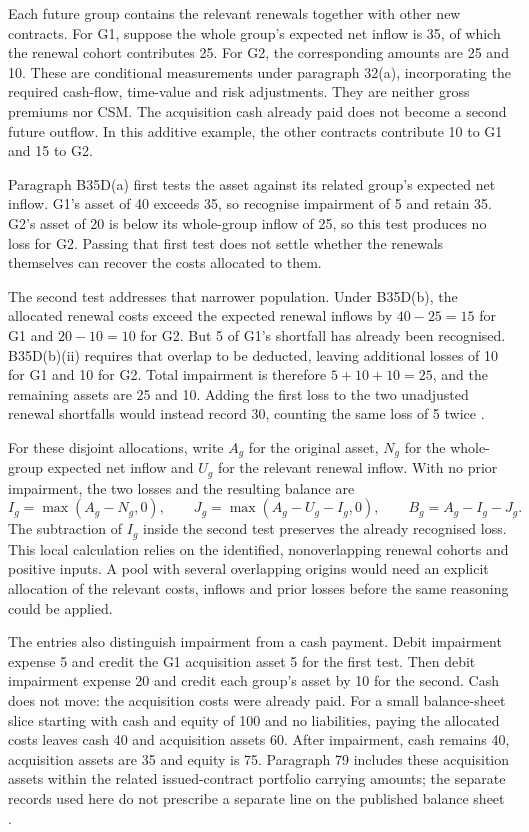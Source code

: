 Each future group contains the relevant renewals together with other new
contracts. For G1, suppose the whole group's expected net inflow is 35,
of which the renewal cohort contributes 25. For G2, the corresponding
amounts are 25 and 10. These are conditional measurements under paragraph
32(a), incorporating the required cash-flow, time-value and risk adjustments.
They are neither gross premiums nor CSM. The acquisition cash already paid
does not become a second future outflow. In this additive example, the
other contracts contribute 10 to G1 and 15 to G2.

Paragraph B35D(a) first tests the asset against its related group's expected
net inflow. G1's asset of 40 exceeds 35, so recognise impairment of 5 and
retain 35. G2's asset of 20 is below its whole-group inflow of 25, so this
test produces no loss for G2. Passing that first test does not settle whether
the renewals themselves can recover the costs allocated to them.

The second test addresses that narrower population. Under B35D(b), the
allocated renewal costs exceed the expected renewal inflows by $40-25=15$
for G1 and $20-10=10$ for G2. But 5 of G1's shortfall has already been
recognised. B35D(b)(ii) requires that overlap to be deducted, leaving
additional losses of 10 for G1 and 10 for G2. Total impairment is therefore
$5+10+10=25$, and the remaining assets are 25 and 10. Adding the first loss
to the two unadjusted renewal shortfalls would instead record 30, counting
the same loss of 5 twice \citep[paragraph B35D]{aasb17}.

For these disjoint allocations, write $A_g$ for the original asset, $N_g$ for
the whole-group expected net inflow and $U_g$ for the relevant renewal
inflow. With no prior impairment, the two losses and the resulting balance
are
\[
 I_g=\max(A_g-N_g,0),\qquad
 J_g=\max(A_g-U_g-I_g,0),\qquad
 B_g=A_g-I_g-J_g.
\]
The subtraction of $I_g$ inside the second test preserves the already
recognised loss. This local calculation relies on the identified, nonoverlapping
renewal cohorts and positive inputs. A pool with several overlapping origins
would need an explicit allocation of the relevant costs, inflows and prior
losses before the same reasoning could be applied.

\clearpage
The entries also distinguish impairment from a cash payment. Debit impairment
expense 5 and credit the G1 acquisition asset 5 for the first test. Then debit
impairment expense 20 and credit each group's asset by 10 for the second.
Cash does not move: the acquisition costs were already paid. For a small
balance-sheet slice starting with cash and equity of 100 and no liabilities,
paying the allocated costs leaves cash 40 and acquisition assets 60. After
impairment, cash remains 40, acquisition assets are 35 and equity is 75.
Paragraph 79 includes these acquisition assets within the related issued-contract
portfolio carrying amounts; the separate records used here do not prescribe
a separate line on the published balance sheet
\citep[paragraphs 28E and 79]{aasb17}.

